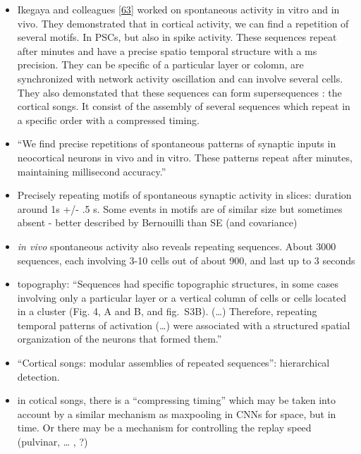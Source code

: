 \begin{itemize}
\tightlist
\item
  Ikegaya and colleagues {[}\protect\hyperlink{ref-Mf6h1KNY}{63}{]} worked on spontaneous activity in vitro and in vivo. They demonstrated that in cortical activity, we can find a repetition of several motifs. In PSCs, but also in spike activity. These sequences repeat after minutes and have a precise spatio temporal structure with a ms precision. They can be specific of a particular layer or colomn, are synchronized with network activity oscillation and can involve several cells. They also demonstated that these sequences can form supersequences : the cortical songs. It consist of the assembly of several sequences which repeat in a specific order with a compressed timing.
\item
  ``We find precise repetitions of spontaneous patterns of synaptic inputs in neocortical neurons in vivo and in vitro. These patterns repeat after minutes, maintaining millisecond accuracy.''
\item
  Precisely repeating motifs of spontaneous synaptic activity in slices: duration around 1s +/- .5 s. Some events in motifs are of similar size but sometimes absent - better described by Bernouilli than SE (and covariance)
\item
  \emph{in vivo} spontaneous activity also reveals repeating sequences. About 3000 sequences, each involving 3-10 cells out of about 900, and last up to 3 seconds
\item
  topography: ``Sequences had specific topographic structures, in some cases involving only a particular layer or a vertical column of cells or cells located in a cluster (Fig. 4, A and B, and fig.~S3B). (\ldots) Therefore, repeating temporal patterns of activation (\ldots) were associated with a structured spatial organization of the neurons that formed them.''
\item
  ``Cortical songs: modular assemblies of repeated sequences'': hierarchical detection.
\item
  in cotical songs, there is a ``compressing timing'' which may be taken into account by a similar mechanism as maxpooling in CNNs for space, but in time. Or there may be a mechanism for controlling the replay speed (pulvinar, \ldots{} , ?)
\end{itemize}

